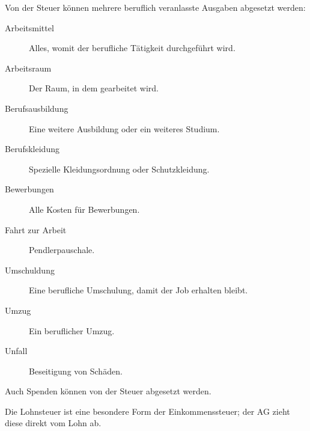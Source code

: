 \documentclass{scrartcl}
\begin{document}
\noindent
Von der Steuer können mehrere beruflich veranlasste Ausgaben abgesetzt werden:

\begin{description}
	\item [Arbeitsmittel] Alles, womit der berufliche Tätigkeit durchgeführt wird.
	\item [Arbeitsraum] Der Raum, in dem gearbeitet wird.
	\item [Berufsausbildung] Eine weitere Ausbildung oder ein weiteres Studium.
	\item [Berufskleidung] Spezielle Kleidungsordnung oder Schutzkleidung.
	\item [Bewerbungen] Alle Kosten für Bewerbungen.
	\item [Fahrt zur Arbeit] Pendlerpauschale.
	\item [Umschuldung] Eine berufliche Umschulung, damit der Job erhalten bleibt.
	\item [Umzug] Ein beruflicher Umzug.
	\item [Unfall] Beseitigung von Schäden.
\end{description}

Auch Spenden können von der Steuer abgesetzt werden.

Die Lohnsteuer ist eine besondere Form der Einkommenssteuer; der AG zieht diese direkt vom Lohn ab.
\end{document}
